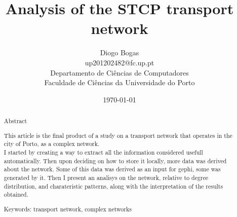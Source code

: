 \documentclass[12pt]{article}
\title{Analysis of the STCP transport network}
\author{Diogo Bogas \\ 
        up201202482@fc.up.pt \\ 
        Departamento de Ciências de Computadores\\
        Faculdade de Ciências da Universidade do Porto\\
        }
\date{\today}
\begin{document}
\maketitle
{}

\begin{abstract}



\begin{center}
Abstract\\
\end{center}

This article is the final product of a study on a transport network that operates in the city of Porto, as a complex network.\\ 
I started by creating a way to extract all the information considered usefull automatically. Then upon deciding on how to store it locally, more data was derived about the network. Some of this data was derived as an input for gephi, some was generated by it. Then I present an analisys on the network, relative to degree distribution, and charateristic patterns, along with the interpretation of the results obtained.


Keywords: transport network, complex networks

\end{abstract}
\end{document}
